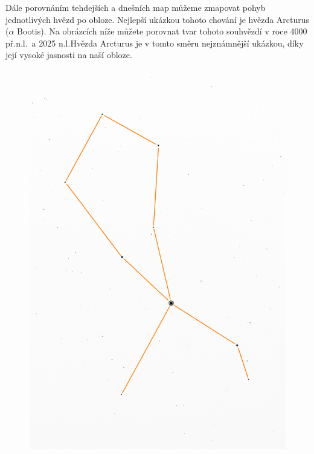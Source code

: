 \documentclass[12pt,a4paper,titlepage]{article}
\begin{document}
Dále porovnáním tehdejších a dnešních map můžeme zmapovat pohyb jednotlivých hvězd po obloze. Nejlepší ukázkou tohoto chování je hvězda Arcturus ($\alpha$ Bootis). Na obrázcích níže můžete porovnat tvar tohoto souhvězdí v roce 4000 př.n.l.\ a 2025 n.l.\@ Hvězda Arcturus je v tomto směru nejznámnější ukázkou, díky její vysoké jasnosti na naší obloze.

\begin{figure}[H]
	\centering
	\begin{minipage}{.45\textwidth}
	  \centering
	  \includegraphics[width=1\linewidth]{-4000.png}
	  ~\label{fig:test1}
	\end{minipage}%
	\hspace{.8cm}
	\begin{minipage}{.45\textwidth}

\end{minipage}
\end{figure}
\end{document}
